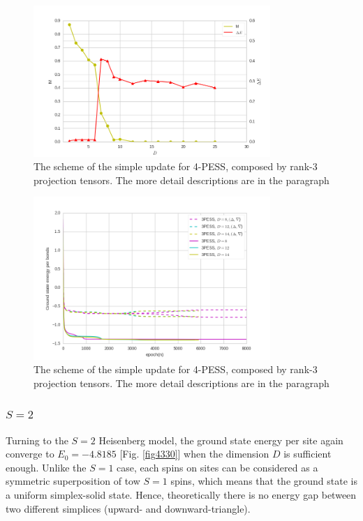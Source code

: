 \begin{figure}[H]
	\centering
	\includegraphics[width=0.80\textwidth]{figures/3pess_MDE.png}
	\caption[The scheme of the simple update for 4-PESS, composed by rank-3 projection tensors.]{The scheme of the simple update for 4-PESS, composed by rank-3 projection tensors. The more detail descriptions are in the paragraph}
	\label{fig4328}
\end{figure}

\begin{figure}[H]
	\centering
	\includegraphics[width=0.80\textwidth]{figures/3pess_GEN.png}
	\caption[The scheme of the simple update for 4-PESS, composed by rank-3 projection tensors.]{The scheme of the simple update for 4-PESS, composed by rank-3 projection tensors. The more detail descriptions are in the paragraph}
	\label{fig4329}
\end{figure}

\subsubsection{$S=2$}

Turning to the $S=2$ Heisenberg model, the ground state energy per site again converge to $E_0 = -4.8185$ [Fig. \ref{fig4330}] when the dimension $D$ is sufficient enough. Unlike the $S=1$ case, each spins on sites can be considered as a symmetric superposition of tow $S=1$ spins, which means that the ground state is a uniform simplex-solid state. Hence, theoretically there is no energy gap between two different simplices (upward- and downward-triangle).

